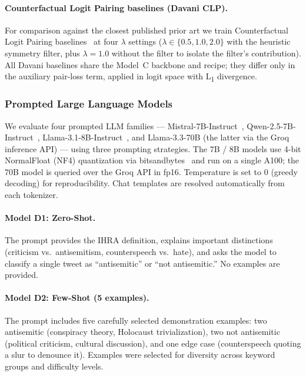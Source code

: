 \documentclass[10pt,a4paper]{article}
\begin{document}
\paragraph{Counterfactual Logit Pairing baselines (Davani CLP).}
For comparison against the closest published prior art we train Counterfactual Logit Pairing baselines~\citep{garg2019counterfactual,davani2021improving} at four $\lambda$ settings ($\lambda \in \{0.5, 1.0, 2.0\}$ with the heuristic symmetry filter, plus $\lambda = 1.0$ without the filter to isolate the filter's contribution). All Davani baselines share the Model~C backbone and recipe; they differ only in the auxiliary pair-loss term, applied in logit space with L\textsubscript{1} divergence.

\subsubsection{Prompted Large Language Models}

We evaluate four prompted LLM families --- Mistral-7B-Instruct~\citep{jiang2023mistral}, Qwen-2.5-7B-Instruct~\citep{qwen25}, Llama-3.1-8B-Instruct~\citep{llama31}, and Llama-3.3-70B (the latter via the Groq inference API) --- using three prompting strategies. The 7B / 8B models use 4-bit NormalFloat (NF4) quantization via bitsandbytes~\citep{dettmers2022gptint} and run on a single A100; the 70B model is queried over the Groq API in fp16. Temperature is set to 0 (greedy decoding) for reproducibility. Chat templates are resolved automatically from each tokenizer.

\paragraph{Model D1: Zero-Shot.}
The prompt provides the IHRA definition, explains important distinctions (criticism vs.\ antisemitism, counterspeech vs.\ hate), and asks the model to classify a single tweet as ``antisemitic'' or ``not antisemitic.'' No examples are provided.

\paragraph{Model D2: Few-Shot (5 examples).}
The prompt includes five carefully selected demonstration examples: two antisemitic (conspiracy theory, Holocaust trivialization), two not antisemitic (political criticism, cultural discussion), and one edge case (counterspeech quoting a slur to denounce it). Examples were selected for diversity across keyword groups and difficulty levels.
\end{document}
